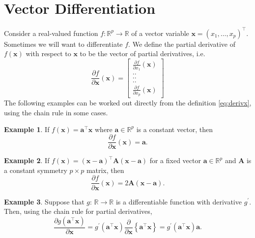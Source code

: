 \documentclass[]{book}
\theoremstyle{definition}
\theoremstyle{definition}
\newtheorem{example}{Example}[chapter]
\theoremstyle{definition}
\theoremstyle{remark}
\begin{document}
\hypertarget{vector-differentiation}{%
\section{Vector Differentiation}\label{vector-differentiation}}

Consider a real-valued function \(f: \mathbb{R}^p \rightarrow \mathbb{R}\) of a vector variable \(\boldsymbol x=(x_1, \ldots , x_p)^\top\). Sometimes we will want to differentiate \(f\). We define the partial derivative of \(f(\boldsymbol x)\) with respect to \(\boldsymbol x\) to be
the vector of partial derivatives, i.e.
\begin{equation}
\frac{\partial f}{\partial \boldsymbol x}(\boldsymbol x)=\left [ \begin{array}{c} \frac{\partial f}{\partial x_1}(\boldsymbol x)\\
 ..\\
 ..\\
 ..\\
 \frac{\partial f}{\partial x_p}(\boldsymbol x)
\end{array} \right ]
\label{eq:derivx}
\end{equation}
The following examples can be worked out directly from the definition \eqref{eq:derivx}, using the chain rule in some cases.

\begin{example}
\protect\hypertarget{exm:unnamed-chunk-13}{}{\label{exm:unnamed-chunk-13} }If \(f(\boldsymbol x)=\boldsymbol a^\top \boldsymbol x\) where \(\boldsymbol a\in \mathbb{R}^p\) is a constant vector, then
\[
\frac{\partial f}{\partial \boldsymbol x}(\boldsymbol x)=\boldsymbol a.
\]
\end{example}

\begin{example}
\protect\hypertarget{exm:unnamed-chunk-14}{}{\label{exm:unnamed-chunk-14} }If \(f(\boldsymbol x)=(\boldsymbol x-\boldsymbol a)^\top \boldsymbol A(\boldsymbol x-\boldsymbol a)\) for a fixed vector \(\boldsymbol a\in \mathbb{R}^p\)
and \(\boldsymbol A\) is a constant symmetry \(p \times p\) matrix, then
\[
\frac{\partial f}{\partial \boldsymbol x}(\boldsymbol x)=2\boldsymbol A(\boldsymbol x-\boldsymbol a).
\]
\end{example}

\begin{example}
\protect\hypertarget{exm:unnamed-chunk-15}{}{\label{exm:unnamed-chunk-15} }Suppose that \(g: \, \mathbb{R} \rightarrow \mathbb{R}\) is a differentiable function with derivative \(g^\prime\). Then, using the chain rule for partial derivatives,
\[
\frac{\partial g(\boldsymbol a^\top \boldsymbol x)}{\partial \boldsymbol x}=g^{\prime}(\boldsymbol a^\top\boldsymbol x)\frac{\partial}{\partial \boldsymbol x}\left \{\boldsymbol a^\top \boldsymbol x\right \}=g^{\prime}(\boldsymbol a^\top\boldsymbol x) \boldsymbol a.
\]
\end{example}
\end{document}
